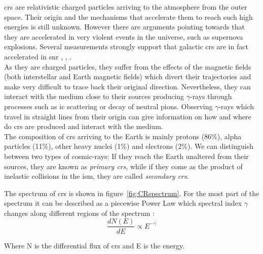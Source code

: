 \documentclass[main.tex]{subfiles}
\begin{document}
\glspl{cr} are relativistic charged particles arriving to the atmosphere from the outer space. Their origin and the mechanisms that accelerate them to reach such high energies is still unknown. However there are arguments pointing towards that they are accelerated in very violent events in the universe, such as supernova explosions. Several measurements strongly support that galactic \glspl{cr} are in fact accelerated in \gls{snr} \cite{2014CRinSNR}, \cite{2013CRinSNR}, \cite{2012CRinSNR}. \\

As they are charged particles, they suffer from the effects of the magnetic fields (both interstellar and Earth magnetic fields) which divert their trajectories and make very difficult to trace back their original direction. Nevertheless, they can interact with the medium close to their sources producing $\gamma$-rays through processes such as \gls{ic} scattering or decay of neutral pions. Observing $\gamma$-rays which travel in straight lines from their origin can give information on how and where do \glspl{cr} are produced and interact with the medium.\\

The composition of \glspl{cr} arriving to the Earth is mainly protons (86\%), alpha particles (11\%), other heavy nuclei (1\%) and electrons (2\%). We can distinguish between two types of cosmic-rays: If they reach the Earth unaltered from their sources, they are known as \textit{primary \glspl{cr}}, while if they come as the product of inelastic collisions in the \gls{ism}, they are called \textit{secondary \glspl{cr}}.

The spectrum of \glspl{cr} is shown in figure~\ref{fig:CRspectrum}. For the most part of the spectrum it can be described as a piecewise Power Law which spectral index $\gamma$ changes along different regions of the spectrum \cite{2016CRSpectrum}:\\

\begin{equation}
    \frac{dN(E)}{dE} \propto E^{-\gamma}
\end{equation}

Where N is the differential flux of \glspl{cr} and E is the energy.
\end{document}
